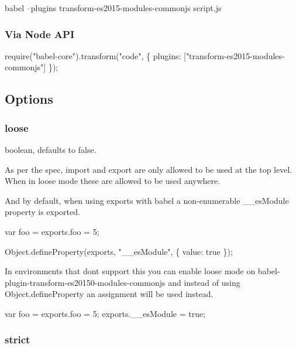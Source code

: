 \begin{DoxyCode}
babel --plugins transform-es2015-modules-commonjs script.js
\end{DoxyCode}


\subsubsection*{Via Node A\+PI}


\begin{DoxyCode}
require("babel-core").transform("code", \{
  plugins: ["transform-es2015-modules-commonjs"]
\});
\end{DoxyCode}


\subsection*{Options}

\subsubsection*{{\ttfamily loose}}

{\ttfamily boolean}, defaults to {\ttfamily false}.

As per the spec, {\ttfamily import} and {\ttfamily export} are only allowed to be used at the top level. When in loose mode these are allowed to be used anywhere.

And by default, when using exports with babel a non-\/enumerable {\ttfamily \+\_\+\+\_\+es\+Module} property is exported.


\begin{DoxyCode}
var foo = exports.foo = 5;

Object.defineProperty(exports, "\_\_esModule", \{
  value: true
\});
\end{DoxyCode}


In environments that don\textquotesingle{}t support this you can enable loose mode on {\ttfamily babel-\/plugin-\/transform-\/es20150-\/modules-\/commonjs} and instead of using {\ttfamily Object.\+define\+Property} an assignment will be used instead.


\begin{DoxyCode}
var foo = exports.foo = 5;
exports.\_\_esModule = true;
\end{DoxyCode}


\subsubsection*{{\ttfamily strict}}

